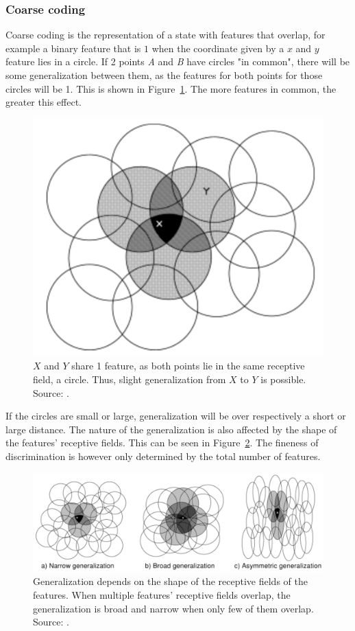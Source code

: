 \documentclass[a4paper]{article}
\begin{document}
\subsubsection{Coarse coding}
Coarse coding is the representation of a state with features that overlap, for example a binary feature that is $1$ when the coordinate given by a $x$ and $y$ feature lies in a circle. If 2 points \textit{A} and \textit{B} have circles "in common", there will be some generalization between them, as the features for both points for those circles will be 1. This is shown in Figure~\ref{fig:coarsecoding1}. The more features in common, the greater this effect.
\begin{figure}[H]
\captionsetup{width=0.8\textwidth}
\centering
\includegraphics[width=0.5\linewidth]{images/coarsecoding1.png}
\caption{$X$ and $Y$ share 1 feature, as both points lie in the same receptive field, a circle. Thus, slight generalization from $X$ to $Y$ is possible. Source: \cite{Sutton1998ReinforcementIntroductionb}.}
\label{fig:coarsecoding1}
\end{figure}
If the circles are small or large, generalization will be over respectively a short or large distance. The nature of the generalization is also affected by the shape of the features' receptive fields.  This can be seen in Figure~\ref{fig:coarsecoding2}. The fineness of discrimination is however only determined by the total number of features.
\begin{figure}[H]
\captionsetup{width=0.8\textwidth}
\centering
\includegraphics[width=0.8\linewidth]{images/coarsecoding2.png}
\caption{Generalization depends on the shape of the receptive fields of the features. When multiple features' receptive fields overlap, the generalization is broad and narrow when only few of them overlap. Source: \cite{Sutton1998ReinforcementIntroductionb}.}
\label{fig:coarsecoding2}
\end{figure}
\end{document}
